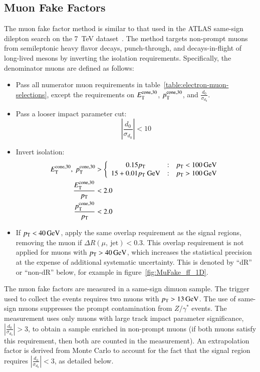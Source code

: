 \subsection{Muon Fake Factors}\label{sec:muon-fake-factors}
The muon fake factor method is similar to that used in the ATLAS same-sign dilepton search on the \SI{7}{\tera\electronvolt} dataset~\cite{TheATLASCollaboration:2012df}. The method targets non-prompt muons from semileptonic heavy flavor decays, punch-through, and decays-in-flight of long-lived mesons by inverting the isolation requirements. Specifically, the denominator muons are defined as follows:
\begin{itemize}
  \item Pass all numerator muon requirements in table~\ref{table:electron-muon-selections}, except the requirements on ${\footnotesize E_{\mathrm{T}}^{\mathrm{cone},30} }$, ${\footnotesize p_{\mathrm{T}}^{\mathrm{cone},30} }$, and $\frac{d_0}{\sigma_{d_0}}$. 
  \item Pass a looser impact parameter cut:
  \begin{equation}
	|\frac{d_0}{\sigma_{d_0}}|<10
  \end{equation}
  \item Invert isolation:
  \begin{align}
	{\footnotesize E_{\mathrm{T}}^{\mathrm{cone},30} },\ {\footnotesize p_{\mathrm{T}}^{\mathrm{cone},30} } &> \left\{\begin{array}{ccc} 0.15 p_{\text{T}} & : & p_{\text{T}}<\SI{100}{\giga\electronvolt} \\ 15+0.01 p_{\text{T}}~\mbox{GeV} & : & p_{\text{T}}>\SI{100}{\giga\electronvolt} \end{array} \right. \\
	{\footnotesize \frac{E_{\mathrm{T}}^{\mathrm{cone},30}}{p_{\text{T}}}} &< 2.0 \\
	{\footnotesize \frac{p_{\mathrm{T}}^{\mathrm{cone},30}}{p_{\text{T}}}} &< 2.0 \\
  \end{align}
  \item If $p_{\text{T}}<\SI{40}{\giga\electronvolt}$, apply the same overlap requirement as the signal regions, removing the muon if $\Delta R (\mu,\ \mbox{jet})<0.3$. This overlap requirement is not applied for muons with $p_{\text{T}}>\SI{40}{\giga\electronvolt}$, which increases the statistical precision at the expense of additional systematic uncertainty. This is denoted by ``dR'' or ``non-dR'' below, for example in figure~\ref{fig:MuFake_ff_1D}.
\end{itemize}

The muon fake factors are measured in a same-sign dimuon sample. The trigger used to collect the events requires two muons with $p_{\text{T}}>\SI{13}{\giga\electronvolt}$. The use of same-sign muons suppresses the prompt contamination from $Z/\gamma^{*}$ events. The measurement uses only muons with large track impact parameter significance, $|\frac{d_0}{\sigma_{d_0}}|>3$, to obtain a sample enriched in non-prompt muons (if both muons satisfy this requirement, then both are counted in the measurement). An extrapolation factor is derived from Monte Carlo to account for the fact that the signal region requires $|\frac{d_0}{\sigma_{d_0}}|<3$, as detailed below.

